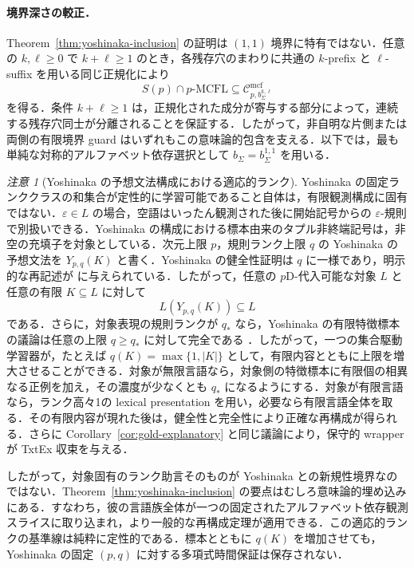 \documentclass[11pt,a4paper]{ltjsarticle}
\numberwithin{equation}{section}
\theoremstyle{plain}
\theoremstyle{definition}
\theoremstyle{remark}
\newtheorem{remark}[theorem]{注意}
\newcommand{\Cmcf}[2]{\mathcal{C}^{\mathrm{mcf}}_{#1,#2}}
\newcommand{\eps}{\varepsilon}
\begin{document}
\paragraph{境界深さの較正．}
Theorem~\ref{thm:yoshinaka-inclusion} の証明は \((1,1)\) 境界に特有ではない．任意の $k,\ell\ge0$ で $k+\ell\ge1$ のとき，各残存穴のまわりに共通の $k$-prefix と $\ell$-suffix を用いる同じ正規化により
\[
  S(p)\cap p\text{-}\mathrm{MCFL}
  \subseteq \Cmcf{p}{b_\Sigma^{k,\ell}}
\]
を得る．条件 $k+\ell\ge1$ は，正規化された成分が寄与する部分によって，連続する残存穴同士が分離されることを保証する．したがって，非自明な片側または両側の有限境界 guard はいずれもこの意味論的包含を支える．以下では，最も単純な対称的アルファベット依存選択として $b_\Sigma=b_\Sigma^{1,1}$ を用いる．

\begin{remark}[Yoshinaka の予想文法構成における適応的ランク]
\label{rem:yoshinaka-adaptive-rank}
Yoshinaka の固定ランククラスの和集合が定性的に学習可能であること自体は，有限観測構成に固有ではない．$\eps\in L$ の場合，空語はいったん観測された後に開始記号からの $\eps$-規則で別扱いできる．Yoshinaka の構成における標本由来のタプル非終端記号は，非空の充填子を対象としている．次元上限 $p$，規則ランク上限 $q$ の Yoshinaka の予想文法を $Y_{p,q}(K)$ と書く．Yoshinaka の健全性証明は $q$ に一様であり，明示的な再記述が \cite[Proposition~1]{CaseYoshinakaZeugmann2013} に与えられている．したがって，任意の $p$D-代入可能な対象 $L$ と任意の有限 $K\subseteq L$ に対して
\[
  L(Y_{p,q}(K))\subseteq L
\]
である．さらに，対象表現の規則ランクが $q_*$ なら，Yoshinaka の有限特徴標本の議論は任意の上限 $q\ge q_*$ に対して完全である \cite{Yoshinaka2011,CaseYoshinakaZeugmann2013}．したがって，一つの集合駆動学習器が，たとえば $q(K)=\max\{1,|K|\}$ として，有限内容とともに上限を増大させることができる．対象が無限言語なら，対象側の特徴標本に有限個の相異なる正例を加え，その濃度が少なくとも $q_*$ になるようにする．対象が有限言語なら，ランク高々1の lexical presentation を用い，必要なら有限言語全体を取る．その有限内容が現れた後は，健全性と完全性により正確な再構成が得られる．さらに Corollary~\ref{cor:gold-explanatory} と同じ議論により，保守的 wrapper が TxtEx 収束を与える．

したがって，対象固有のランク助言そのものが Yoshinaka との新規性境界なのではない．Theorem~\ref{thm:yoshinaka-inclusion} の要点はむしろ意味論的埋め込みにある．すなわち，彼の言語族全体が一つの固定されたアルファベット依存観測スライスに取り込まれ，より一般的な再構成定理が適用できる．この適応的ランクの基準線は純粋に定性的である．標本とともに $q(K)$ を増加させても，Yoshinaka の固定 $(p,q)$ に対する多項式時間保証は保存されない．
\end{remark}
\end{document}
